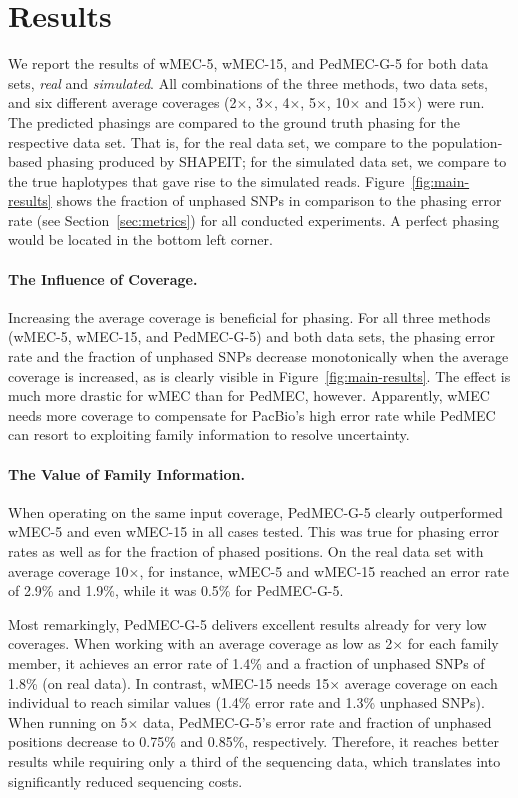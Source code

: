 \section{Results}
We report the results of  wMEC-5, wMEC-15, and \mbox{PedMEC-G-5} for both data sets, \emph{real} and \emph{simulated}.
All combinations of the three methods, two data sets, and six different average coverages (2$\times$, 3$\times$, 4$\times$, 5$\times$, 10$\times$ and 15$\times$) were run.
The predicted phasings are compared to the ground truth phasing for the respective data set.
That is, for the real data set, we compare to the population-based phasing produced by SHAPEIT; for the simulated data set, we compare to the true haplotypes that gave rise to the simulated reads.
Figure~\ref{fig:main-results} shows the fraction of unphased SNPs in comparison to the phasing error rate (see Section~\ref{sec:metrics}) for all conducted experiments.
A perfect phasing would be located in the bottom left corner.

\paragraph{The Influence of Coverage.}
Increasing the average coverage is beneficial for phasing.
For all three methods (wMEC-5, wMEC-15, and \mbox{PedMEC-G-5}) and both data sets, the phasing error rate and the fraction of unphased SNPs decrease monotonically when the average coverage is increased, as is clearly visible in Figure~\ref{fig:main-results}.
The effect is much more drastic for wMEC than for PedMEC, however.
Apparently, wMEC needs more coverage to compensate for PacBio's high error rate while PedMEC can resort to exploiting family information to resolve uncertainty.

\paragraph{The Value of Family Information.}
When operating on the same input coverage, \mbox{PedMEC-G-5} clearly outperformed wMEC-5 and even wMEC-15 in all cases tested.
This was true for phasing error rates as well as for the fraction of phased positions.
On the real data set with average coverage 10$\times$, for instance, wMEC-5 and wMEC-15 reached an error rate of 2.9\% and 1.9\%, while it was 0.5\% for \mbox{PedMEC-G-5}.

Most remarkingly, \mbox{PedMEC-G-5} delivers excellent results already for very low coverages.
When working with an average coverage as low as 2$\times$ for each family member, it achieves an error rate of 1.4\% and a fraction of unphased SNPs of 1.8\% (on real data).
In contrast, wMEC-15 needs 15$\times$ average coverage on each individual to reach similar values (1.4\% error rate and 1.3\% unphased SNPs).
When running on 5$\times$ data, \mbox{PedMEC-G-5}'s error rate and fraction of unphased positions decrease to 0.75\% and 0.85\%, respectively.
Therefore, it reaches better results while requiring only a third of the sequencing data, which translates into significantly reduced sequencing costs.

